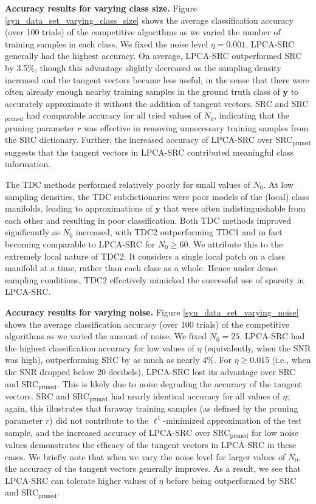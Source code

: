 \documentclass[review]{elsarticle}
\begin{document}
\textbf{Accuracy results for varying class size.} Figure \ref{syn_data_set_varying_class_size} shows the average classification accuracy (over 100 trials) of the competitive algorithms as we varied the number of training samples in each class. We fixed the noise level $\eta = 0.001$. LPCA-SRC generally had the highest accuracy. On average, LPCA-SRC outperformed SRC by 3.5\%, though this advantage slightly decreased as the sampling density increased and the tangent vectors became less useful, in the sense that there were often already enough nearby training samples in the ground truth class of $\bm{y}$ to accurately approximate it without the addition of tangent vectors. SRC and SRC$_\mathrm{pruned}$ had comparable accuracy for all tried values of $N_0$, indicating that the pruning parameter $r$ was effective in removing unnecessary training samples from the SRC dictionary. Further, the increased accuracy of LPCA-SRC over SRC$_\mathrm{pruned}$ suggests that the tangent vectors in LPCA-SRC contributed meaningful class information.
 
The TDC methods performed relatively poorly for small values of $N_0$. At low sampling densities, the TDC subdictionaries were poor models of the (local) class manifolds, leading to approximations of $\bm{y}$ that were often indistinguishable from each other and resulting in poor classification. Both TDC methods improved significantly as $N_0$ increased, with TDC2 outperforming TDC1 and in fact becoming comparable to LPCA-SRC for $N_0 \geq 60$. We attribute this to the extremely local nature of TDC2: It considers a single local patch on a class manifold at a time, rather than each class as a whole. Hence under dense sampling conditions, TDC2 effectively mimicked the successful use of sparsity in LPCA-SRC.







\textbf{Accuracy results for varying noise.} Figure \ref{syn_data_set_varying_noise} shows the average classification accuracy (over 100 trials) of the competitive algorithms as we varied the amount of noise. We fixed $N_0 = 25$. LPCA-SRC had the highest classification accuracy for low values of $\eta$ (equivalently, when the SNR was high), outperforming SRC by as much as nearly $4\%$. For $\eta \geq 0.015$ (i.e., when the SNR dropped below 20 decibels), LPCA-SRC lost its advantage over SRC and SRC$_\mathrm{pruned}$. This is likely due to noise degrading the accuracy of the tangent vectors. SRC and SRC$_\mathrm{pruned}$ had nearly identical accuracy for all values of $\eta$; again, this illustrates that faraway training samples (as defined by the pruning parameter $r$) did not contribute to the $\ell^1$-minimized approximation of the test sample, and the increased accuracy of LPCA-SRC over SRC$_\mathrm{pruned}$ for low noise values demonstrates the efficacy of the tangent vectors in LPCA-SRC in these cases. We briefly note that when we vary the noise level for larger values of $N_0$, the accuracy of the tangent vectors generally improves. As a result, we see that LPCA-SRC can tolerate higher values of $\eta$ before being outperformed by SRC and SRC$_\mathrm{pruned}$. 
\end{document}
